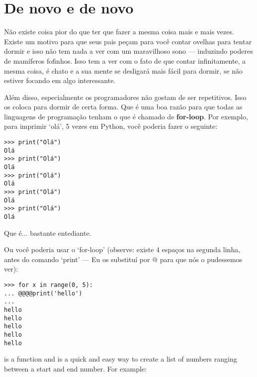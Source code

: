 

\chapter{De novo e de novo}\label{ch:againandagain}

Não existe coisa pior do que ter que fazer a mesma coisa mais e mais vezes. Existe um motivo para que seus pais peçam para você contar ovelhas para tentar dormir e isso não tem nada a ver com um maravilhoso sono --- induzindo poderes de mamíferos fofinhos. Isso tem a ver com o fato de que contar infinitamente, a mesma coisa, é chato e a sua mente se desligará mais fácil para dormir, se não estiver focando em algo interessante.
\par
Além disso, especialmente os programadores não gostam de ser repetitivos. Isso os coloca para dormir de certa forma. Que é uma boa razão para que todas as linguagens de programação tenham o que é chamado de \textbf{for-loop}. Por exemplo, para imprimir `olá', 5 vezes em Python, você poderia fazer o seguinte:

\begin{listing}
\begin{verbatim}
>>> print("Olá")
Olá
>>> print("Olá")
Olá
>>> print("Olá")
Olá
>>> print("Olá")
Olá
>>> print("Olá")
Olá
\end{verbatim}
\end{listing}

Que é$\ldots$ bastante entediante.

Ou você poderia usar o `for-loop' (observe: existe 4 espaços na segunda linha, antes do comando `print' --- Eu os substituí por @ para que nós o pudessemos ver):

\begin{listingignore}
\begin{verbatim}
>>> for x in range(0, 5):
... @@@@print('hello')
... 
hello
hello
hello
hello
hello
\end{verbatim}
\end{listingignore}

 is a function and is a quick and easy way to create a list of numbers ranging between a start and end number. For example:

